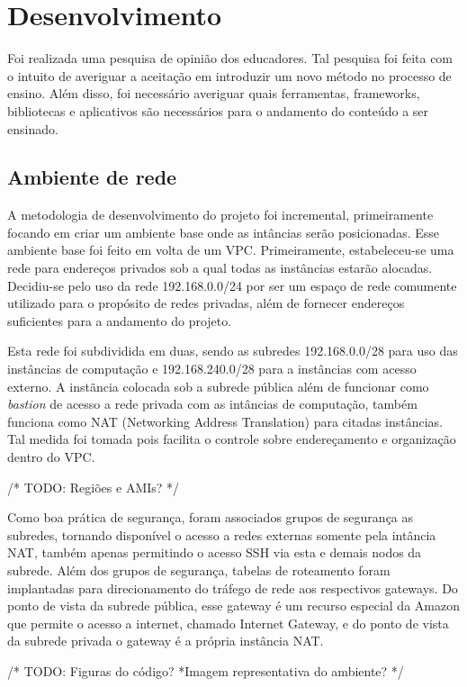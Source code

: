 \documentclass[tg]{mdtufsm}
\begin{document}
\chapter{Desenvolvimento}

Foi realizada uma pesquisa de opinião dos educadores. Tal pesquisa foi feita com o intuito de averiguar a aceitação em introduzir um novo método no processo de ensino. Além disso, foi necessário averiguar quais ferramentas, frameworks, bibliotecas e aplicativos são necessários para o andamento do conteúdo a ser ensinado.

\section{Ambiente de rede}

A metodologia de desenvolvimento do projeto foi incremental, primeiramente focando em criar um ambiente base onde as intâncias serão posicionadas. Esse ambiente base foi feito em volta de um VPC. Primeiramente, estabeleceu-se uma rede para endereços privados sob a qual todas as instâncias estarão alocadas. Decidiu-se pelo uso da rede 192.168.0.0/24 por ser um espaço de rede comumente utilizado para o propósito de redes privadas, além de fornecer endereços suficientes para a andamento do projeto.

Esta rede foi subdividida em duas, sendo as subredes 192.168.0.0/28 para uso das instâncias de computação e 192.168.240.0/28 para a instâncias com acesso externo. A instãncia colocada sob a subrede pública além de funcionar como \emph{bastion} de acesso a rede privada com as intâncias de computação, também funciona como NAT (Networking Address Translation) para citadas instâncias. Tal medida foi tomada pois facilita o controle sobre endereçamento e organização dentro do VPC.

/* TODO: Regiões e AMIs? */

Como boa prática de segurança, foram associados grupos de segurança as subredes, tornando disponível o acesso a redes externas somente pela intância NAT, também apenas permitindo o acesso SSH via esta e demais nodos da subrede. Além dos grupos de segurança, tabelas de roteamento foram implantadas para direcionamento do tráfego de rede aos respectivos gateways. Do ponto de vista da subrede pública, esse gateway é um recurso especial da Amazon que permite o acesso a internet, chamado Internet Gateway, e do ponto de vista da subrede privada o gateway é a própria instância NAT.

/* TODO: Figuras do código?
*Imagem representativa do ambiente? */
\end{document}
